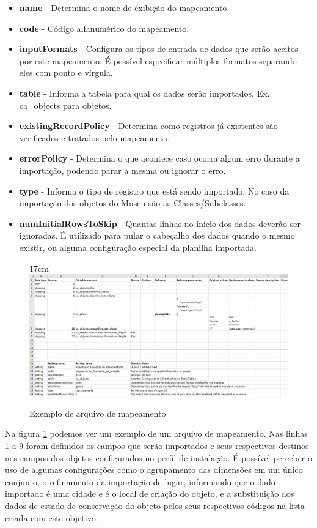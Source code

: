 \documentclass[a4paper,12pt,oneside,onecolumn,final,fleqn]{repUERJ}
\begin{document}
\begin{itemize}
	\item \textbf{name} - Determina o nome de exibição do mapeamento.
	\item \textbf{code} - Código alfanumérico do mapeamento.
	\item \textbf{inputFormats} - Configura os tipos de entrada de dados que serão aceitos por este mapeamento. É possível especificar múltiplos formatos separando eles com ponto e vírgula.
	\item \textbf{table} - Informa a tabela para qual os dados serão importados. Ex.: ca\_objects para objetos.
	\item \textbf{existingRecordPolicy} - Determina como registros já existentes são verificados e tratados pelo mapeamento.
	\item \textbf{errorPolicy} - Determina o que acontece caso ocorra algum erro durante a importação, podendo parar a mesma ou ignorar o erro.
	\item \textbf{type} - Informa o tipo de registro que está sendo importado. No caso da importação dos objetos do Museu são as Classes/Subclasses.
	\item \textbf{numInitialRowsToSkip} - Quantas linhas no início dos dados deverão ser ignoradas. É utilizado para pular o cabeçalho dos dados quando o mesmo existir, ou alguma configuração especial da planilha importada.
\end{itemize}

\begin{figure}[!ht]{17cm}
	\includegraphics[width=15cm, left]{figuras/ex_map.jpg}
	\caption{Exemplo de arquivo de mapeamento} \label{fig:map}
\end{figure}

Na figura \ref{fig:map} podemos ver um exemplo de um arquivo de mapeamento. Nas linhas 1 a 9 foram definidos os campos que serão importados e seus respectivos destinos nos campos dos objetos configurados no perfil de instalação. É possível perceber o uso de algumas configurações como o agrupamento das dimensões em um único conjunto, o refinamento da importação de lugar, informando que o dado importado é uma cidade e é o local de criação do objeto, e a substituição dos dados de estado de conservação do objeto pelos seus respectivos códigos na lista criada com este objetivo.
\end{document}
